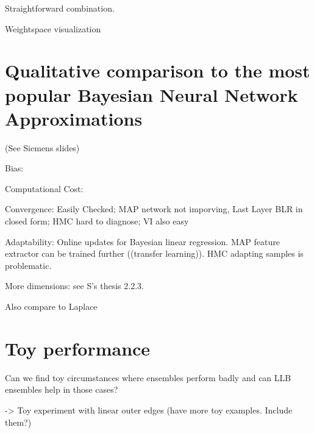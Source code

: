 \documentclass[../thesis.tex]{subfiles}
\begin{document}
Straightforward combination.

Weightspace visualization


\section{Qualitative comparison to the most popular Bayesian Neural Network Approximations}
(See Siemens slides)

Bias:

Computational Cost: 

Convergence:  Easily Checked; MAP network not imporving, Last Layer BLR in closed form; HMC hard to diagnose; VI also easy

Adaptability: Online updates for Bayesian linear regression. MAP feature extractor can be trained further ((transfer learning)). HMC adapting samples is problematic.

More dimensions: see S's thesis 2.2.3.

Also compare to Laplace


\section{Toy performance}
Can we find toy circumstances where ensembles perform badly and can LLB ensembles help in those cases?

-> Toy experiment with linear outer edges (have more toy examples. Include them?)
\end{document}
